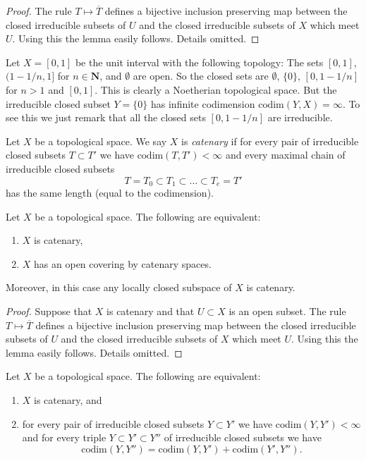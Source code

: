\begin{proof}
The rule $T \mapsto \overline{T}$ defines a bijective
inclusion preserving map between the closed irreducible subsets
of $U$ and the closed irreducible subsets of $X$ which meet $U$.
Using this the lemma easily follows. Details omitted.
\end{proof}

\begin{example}
\label{example-Noetherian-infinite-codimension}
Let $X = [0, 1]$ be the unit interval with the following
topology: The sets $[0, 1]$, $(1 - 1/n, 1]$ for $n \in \mathbf{N}$, and
$\emptyset$ are open. So the closed sets are
$\emptyset$, $\{0\}$, $[0, 1 - 1/n]$ for $n > 1$ and $[0, 1]$.
This is clearly a Noetherian topological space.
But the irreducible closed subset $Y = \{0\}$ has infinite
codimension $\text{codim}(Y, X) = \infty$.
To see this we just remark that all the closed sets
$[0, 1 - 1/n]$ are irreducible.
\end{example}

\begin{definition}
\label{definition-catenary}
Let $X$ be a topological space. We say $X$ is {\it catenary} if
for every pair of irreducible closed subsets $T \subset T'$
we have $\text{codim}(T, T') < \infty$ and every maximal chain
of irreducible closed subsets
$$
T = T_0 \subset T_1 \subset \ldots \subset T_e = T'
$$
has the same length (equal to the codimension).
\end{definition}

\begin{lemma}
\label{lemma-catenary}
Let $X$ be a topological space.
The following are equivalent:
\begin{enumerate}
\item $X$ is catenary,
\item $X$ has an open covering by catenary spaces.
\end{enumerate}
Moreover, in this case any locally closed subspace of $X$ is catenary.
\end{lemma}

\begin{proof}
Suppose that $X$ is catenary and that $U \subset X$ is an open
subset. The rule $T \mapsto \overline{T}$ defines a bijective
inclusion preserving map between the closed irreducible subsets
of $U$ and the closed irreducible subsets of $X$ which meet $U$.
Using this the lemma easily follows. Details omitted.
\end{proof}

\begin{lemma}
\label{lemma-catenary-in-codimension}
Let $X$ be a topological space. The following are equivalent:
\begin{enumerate}
\item $X$ is catenary, and
\item for every pair of irreducible closed subsets $Y \subset Y'$ we have
$\text{codim}(Y, Y') < \infty$ and for every triple
$Y \subset Y' \subset Y''$ of irreducible closed subsets we have
$$
\text{codim}(Y, Y'') = \text{codim}(Y, Y') + \text{codim}(Y', Y'').
$$
\end{enumerate}
\end{lemma}

